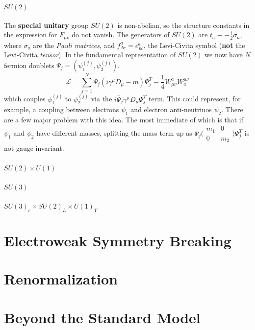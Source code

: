 \paragraph{$SU(2)$}
The \textbf{special unitary} group $SU(2)$ is non-abelian, so the structure constants in the expression for $F_{\mu\nu}$ do not vanish.
The generators of $SU(2)$ are $t_a \equiv -\frac{i}{2}\sigma_a$, where $\sigma_a$ are the \textit{Pauli matrices}, and $f^a_{\ bc} = \epsilon^a_{\ bc}$, the Levi-Civita symbol (\textbf{not} the Levi-Civita \textit{tensor}).
In the fundamental representation of $SU(2)$ we now have $N$ fermion doublets $\Psi_j = \left( \psi_1^{(j)} , \psi_2^{(j)} \right)$.
\begin{equation}
    \mathcal{L} = \sum_{j=1}^{N} \bar{\Psi}_j \left( i\gamma^\mu D_\mu - m \right) \Psi_j^T - \frac{1}{4}W^a_{\mu\nu}W^{\mu\nu}_a
\end{equation}
which couples $\psi_1^{(j)}$ to $\psi_2^{(j)}$ via the $i \bar{\Psi}_j \gamma^\mu D_\mu \Psi_j^T$ term.
This could represent, for example, a coupling between electrons $\psi_1$ and electron anti-neutrinos $\psi_2$. 
There are a few major problem with this idea.
The most immediate of which is that if $\psi_1$ and $\psi_2$ have different masses,
splitting the mass term up as $\Psi_j \bigl(\begin{smallmatrix} m_1&0 \\ 0&m_2 \end{smallmatrix}\bigr) \Psi_j^T$ is not gauge invariant.

\paragraph{$SU(2) \times U(1)$}
\paragraph{$SU(3)$}
\paragraph{$SU(3)_c \times SU(2)_L \times U(1)_Y$}

\section{Electroweak Symmetry Breaking}
\section{Renormalization}
\section{Beyond the Standard Model}

